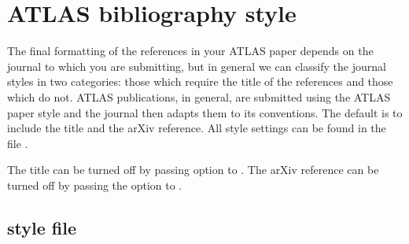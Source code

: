 \documentclass[REPORT=false, UKenglish]{atlasdoc}
\begin{document}
\section{ATLAS bibliography style}
\label{sec:atlasbst}

The final formatting of the references in your ATLAS paper depends on the journal to which you are submitting,
but in general we can classify the journal styles in two categories:
those which require the title of the references and those which do not.
ATLAS publications, in general, are submitted using the ATLAS paper style
and the journal then adapts them to its conventions.
The default is to include the title and the arXiv reference.
All  style settings can be found in the file .

The title can be turned off by passing option  to .
The arXiv reference can be turned off by passing the option  to .


\subsection{ style file}
\end{document}
